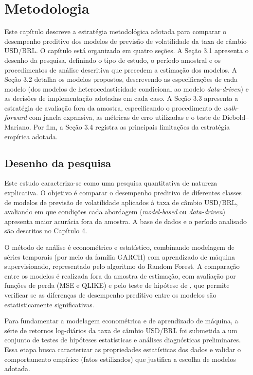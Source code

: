 \chapter{Metodologia}
Este capítulo descreve a estratégia metodológica adotada para comparar o desempenho preditivo dos modelos de previsão de volatilidade da taxa de câmbio USD/BRL. O capítulo está organizado em quatro seções. A Seção 3.1 apresenta o desenho da pesquisa, definindo o tipo de estudo, o período amostral e os procedimentos de análise descritiva que precedem a estimação dos modelos. A Seção 3.2 detalha os modelos propostos, descrevendo as especificações de cada modelo (dos modelos de heterocedasticidade condicional ao modelo \textit{data-driven}) e as decisões de implementação adotadas em cada caso. A Seção 3.3 apresenta a estratégia de avaliação fora da amostra, especificando o procedimento de \textit{walk-forward} com janela expansiva, as métricas de erro utilizadas e o teste de Diebold–Mariano. Por fim, a Seção 3.4 registra as principais limitações da estratégia empírica adotada.

\section{Desenho da pesquisa}
Este estudo caracteriza-se como uma pesquisa quantitativa de natureza explicativa. O objetivo é comparar o desempenho preditivo 
de diferentes classes de modelos de previsão de volatilidade aplicados à taxa de câmbio USD/BRL, avaliando em que condições cada 
abordagem (\textit{model-based} ou \textit{data-driven}) apresenta maior acurácia fora da amostra. A base de dados e o período analisado são descritos no Capítulo 4.

O método de análise é econométrico e estatístico, combinando modelagem de séries temporais (por meio da família
 GARCH) com aprendizado de máquina supervisionado, representado pelo algoritmo do Random Forest. A comparação entre os 
 modelos é realizada fora da amostra de estimação, com avaliação por funções de perda (MSE e QLIKE) e pelo teste de hipótese de 
 \textcite{diebold1995comparing}, que permite verificar se as diferenças de desempenho preditivo entre os modelos são estatisticamente 
 significativas.

Para fundamentar a modelagem econométrica e de aprendizado de máquina, a série de retornos log-diários da taxa de câmbio USD/BRL foi submetida a um conjunto de testes de hipóteses estatísticas e análises diagnósticas preliminares. Essa etapa busca caracterizar as propriedades estatísticas dos dados e validar o comportamento empírico (fatos estilizados) que justifica a escolha de modelos adotada.

